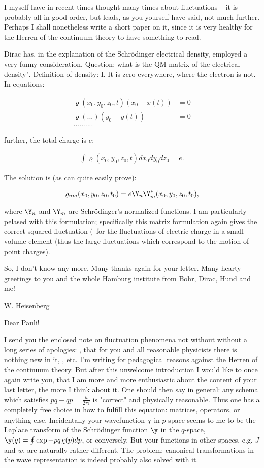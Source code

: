 \documentclass{article}
\newcommand{\uequ}[1]{
\begin{align*}
#1
\end{align*}
}
\begin{document}
I myself have in recent times thought many times about fluctuations -- it is probably all in good order, but leads, as you yourself have said, not much further. Perhaps I shall nonetheless write a short paper on it, since it is very healthy for the Herren of the continuum theory to have something to read.

Dirac has, in the explanation of the Schr\"odinger electrical density, employed a very funny consideration. Question: what is the QM matrix of the electrical density". Definition of density: I. It is zero everywhere, where the electron is not. In equations:
\uequ{
\varrho(x_0,y_0,z_0,t)(x_0-x(t))&=0\\
\varrho(...          )(y_0-y(t))&=0\\
..........
}
further, the total charge is $e$:
\uequ{
\int\varrho(x_0,y_0,z_0,t)dx_0 dy_0 dz_0 = e.
}
The solution is (as can quite easily prove):
\uequ{
\varrho_{nm}(x_0,y_0,z_0,t_0) = e\Y_n \Y_m^*(x_0,y_0,z_0,t_0),
}
where $\Y_n$ and $\Y_m$ are Schr\"odinger's normalized functions. I am particularly pelased with this formulation; specifically this matrix formulation again gives the correct squared fluctuation (\ for the fluctuations of electric charge in a small volume element (thus the large fluctuations which correspond to the motion of point charges).

So, I don't know any more. Many thanks again for your letter. Many hearty greetings to you and the whole Hamburg institute from Bohr, Dirac, Hund and me!

W. Heisenberg

\date{November 4, 1926}

Dear Pauli!

I send you the enclosed note on fluctuation phenomena not without without a long series of apologies: , that for you and all reasonable physicists there is nothing new in it, , etc. I'm writing for pedagogical reasons against the Herren of the continuum theory. But after this unwelcome introduction I would like to once again write you, that I am more and more enthusiastic about the content of your last letter, the more I think about it. One should then say in general: any schema which satisfies $pq-qp=\frac{h}{2\pi i}$ is "correct" and physically reasonable. Thus one has a completely free choice in how to fulfill this equation: matrices, operators, or anything else. Incidentally your wavefunction $\chi$ in $p$-space seems to me to be the Laplace transform of the Schr\"odinger function $\y$
in the $q$-space, $\y(q)=\oint\exp{+pq}\chi(p) dp$, or conversely. But your functions in other spaces, e.g. $J$ and $w$, are naturally rather different. The problem: canonical transformations in the wave representation is indeed probably also solved with it.
\end{document}
